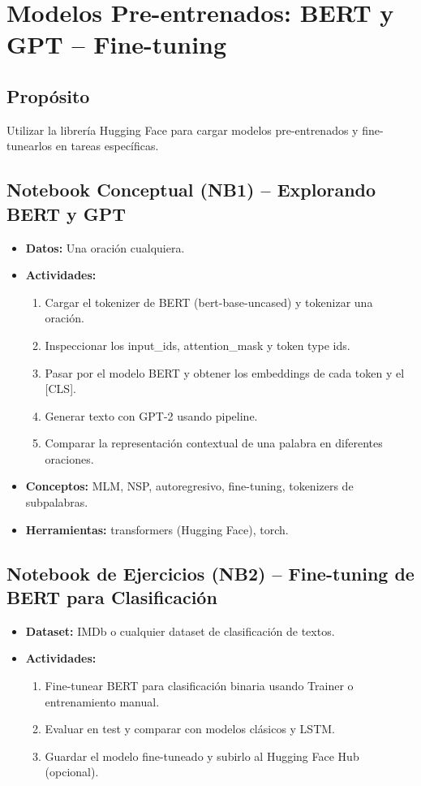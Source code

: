\documentclass[12pt,a4paper]{article}
\begin{document}
\section{Modelos Pre-entrenados: BERT y GPT – Fine-tuning}
\subsection*{Propósito}
Utilizar la librería Hugging Face para cargar modelos pre-entrenados y fine-tunearlos en tareas específicas.

\subsection*{Notebook Conceptual (NB1) – Explorando BERT y GPT}
\begin{itemize}
    \item \textbf{Datos:} Una oración cualquiera.
    \item \textbf{Actividades:}
    \begin{enumerate}
        \item Cargar el tokenizer de BERT (bert-base-uncased) y tokenizar una oración.
        \item Inspeccionar los input_ids, attention_mask y token type ids.
        \item Pasar por el modelo BERT y obtener los embeddings de cada token y el [CLS].
        \item Generar texto con GPT-2 usando pipeline.
        \item Comparar la representación contextual de una palabra en diferentes oraciones.
    \end{enumerate}
    \item \textbf{Conceptos:} MLM, NSP, autoregresivo, fine-tuning, tokenizers de subpalabras.
    \item \textbf{Herramientas:} transformers (Hugging Face), torch.
\end{itemize}

\subsection*{Notebook de Ejercicios (NB2) – Fine-tuning de BERT para Clasificación}
\begin{itemize}
    \item \textbf{Dataset:} IMDb o cualquier dataset de clasificación de textos.
    \item \textbf{Actividades:}
    \begin{enumerate}
        \item Fine-tunear BERT para clasificación binaria usando Trainer o entrenamiento manual.
        \item Evaluar en test y comparar con modelos clásicos y LSTM.
        \item Guardar el modelo fine-tuneado y subirlo al Hugging Face Hub (opcional).
    \end{enumerate}
\end{itemize}
\end{document}
